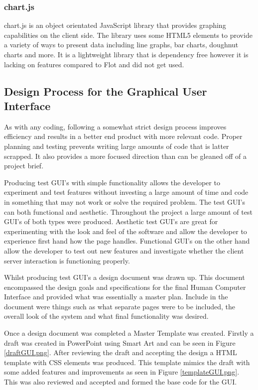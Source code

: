 \subsubsection{chart.js}
chart.js\cite{chart.js} is an object orientated JavaScript library that provides graphing capabilities on the client side.  The library uses some HTML5 elements to provide a variety of ways to present data including line graphs, bar charts, doughnut charts and more.  It is a lightweight library that is dependency free however it is lacking on features compared to Flot and did not get used.

\subsection{Design Process for the Graphical User Interface}

As with any coding, following a somewhat strict design process improves efficiency and results in a better end product with more relevant code.  Proper planning and testing prevents writing large amounts of code that is latter scrapped.  It also provides a more focused direction than can be gleaned off of a project brief.


Producing test GUI's with simple functionality allows the developer to experiment and test features without investing a large amount of time and code in something that may not work or solve the required problem.  The test GUI's can both functional and aesthetic.  Throughout the project a large amount of test GUI's of both types were produced.   Aesthetic test GUI's are great for experimenting with the look and feel of the software and allow the developer to experience first hand how the page handles. Functional GUI's on the other hand allow the developer to test out new features and  investigate whether the client server interaction is functioning properly.

Whilst producing test GUI's a design document was drawn up.  This document encompassed the design goals and specifications for the final Human Computer Interface and provided what was essentially a master plan.  Include in the document were things such as what separate pages were to be included, the overall look of the system and what final functionality was desired.  


Once a design document was completed a Master Template was created.  Firstly a draft was created in PowerPoint using Smart Art and can be seen in Figure \ref{draftGUI.png}.  After reviewing the draft and accepting the design a  HTML template with CSS elements was produced.  This template mimics the draft with some added features and improvements as seen in Figure \ref{templateGUI.png}.  This was also reviewed and accepted and formed the base code for the GUI.

